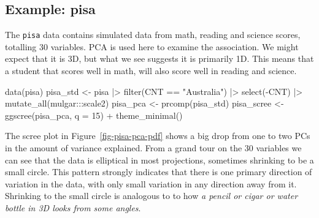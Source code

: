 \documentclass[
  letterpaper,
]{krantz}
\newenvironment{Shaded}{\begin{snugshade}}{\end{snugshade}}
\newcommand{\AttributeTok}[1]{\textcolor[rgb]{0.40,0.45,0.13}{#1}}
\newcommand{\DecValTok}[1]{\textcolor[rgb]{0.68,0.00,0.00}{#1}}
\newcommand{\FunctionTok}[1]{\textcolor[rgb]{0.28,0.35,0.67}{#1}}
\newcommand{\NormalTok}[1]{\textcolor[rgb]{0.00,0.23,0.31}{#1}}
\newcommand{\OtherTok}[1]{\textcolor[rgb]{0.00,0.23,0.31}{#1}}
\newcommand{\SpecialCharTok}[1]{\textcolor[rgb]{0.37,0.37,0.37}{#1}}
\newcommand{\StringTok}[1]{\textcolor[rgb]{0.13,0.47,0.30}{#1}}
\begin{document}
\subsection{Example: pisa}\label{example-pisa}


The \texttt{pisa} data contains simulated data from math, reading and
science scores, totalling 30 variables. PCA is used here to examine the
association. We might expect that it is 3D, but what we see suggests it
is primarily 1D. This means that a student that scores well in math,
will also score well in reading and science.

\begin{Shaded}
\begin{Highlighting}[]
\FunctionTok{data}\NormalTok{(pisa)}
\NormalTok{pisa\_std }\OtherTok{\textless{}{-}}\NormalTok{ pisa }\SpecialCharTok{|\textgreater{}}
  \FunctionTok{filter}\NormalTok{(CNT }\SpecialCharTok{==} \StringTok{"Australia"}\NormalTok{) }\SpecialCharTok{|\textgreater{}}
  \FunctionTok{select}\NormalTok{(}\SpecialCharTok{{-}}\NormalTok{CNT) }\SpecialCharTok{|\textgreater{}}
  \FunctionTok{mutate\_all}\NormalTok{(mulgar}\SpecialCharTok{:::}\NormalTok{scale2)}
\NormalTok{pisa\_pca }\OtherTok{\textless{}{-}} \FunctionTok{prcomp}\NormalTok{(pisa\_std)}
\NormalTok{pisa\_scree }\OtherTok{\textless{}{-}} \FunctionTok{ggscree}\NormalTok{(pisa\_pca, }\AttributeTok{q =} \DecValTok{15}\NormalTok{) }\SpecialCharTok{+} \FunctionTok{theme\_minimal}\NormalTok{()}
\end{Highlighting}
\end{Shaded}

The scree plot in Figure~\ref{fig-pisa-pca-pdf} shows a big drop from
one to two PCs in the amount of variance explained. From a grand tour on
the 30 variables we can see that the data is elliptical in most
projections, sometimes shrinking to be a small circle. This pattern
strongly indicates that there is one primary direction of variation in
the data, with only small variation in any direction away from it.
Shrinking to the small circle is analogous to to how \emph{a pencil or
cigar or water bottle in 3D looks from some angles}.
\end{document}
